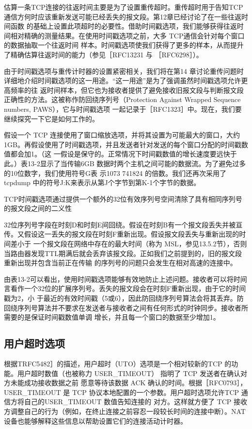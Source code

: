 估算一条TCP连接的往返时间主要是为了设置重传超时。重传超时用于告知TCP通信方何时应该重新发送可能已经丢失的报文段。第12章已经讨论了在一些往返时间函数
的基础上设置此项超时的必要性。借助时间戳选项，我们能够获得往返时间相对精确的测量结果。在使用时间戳选项之前，大多 TCP通信会针对每个窗口的数据抽取一个往返时间
样本。时间戳选项使我们获得了更多的样本，从而提升了精确估算往返时间的能力（参见［RFC13231 与 ［RFC6298］）。

由于时间戳选项与重传计时器的设置紧密相关，我们将在第14 章讨论重传问题时详细地介绍时间戳选项的这一用途。“这一用途”是为了强调虽然时间戳选项允许更高频率的往
返时间样本，但它也为接收者提供了避免接收旧报文段与判断报文段正确性的方法。这被称作防回绕序列号（Protection Against Wrapped Sequence numbers, PAWS），它与时间戳选项
一起记录于［RFC1323］中。现在，我们要继续探究一下它是如何工作的。

假设一个 TCP 连接使用了窗口缩放选项，并将其设置为可能最大的窗口，大约1GB。再假设使用了时间戳选项，并且发送者针对发送的每个窗口分配的时间戳数值都会加1。（这
一假设是保守的。正常情况下时间戳数值的增长速度要远快于此。）表13-2显示了当传输6GB 数据时两个主机之间可能的数据流。为了避免过多的10位数字，我们使用符号G表
示1073 741824 的倍数。我们还再次采用了 tcpdump 中的符号J:K来表示从第J个字节到第K-1个字节的数据。

TCP时间戳选项通过提供一个额外的32位有效序列号空间清除了具有相同序列号的报文段之间的二义性

32位序列号字段在时刻D和时刻E间回绕。假设在时刻B有一个报文段丢失并被亘传。又假设这一丢失的报文段在时刻F重新出现。假设报文段丢失与重新出现的时间差小于
一个报文段在网络中存在的最大时间（称为 MSL，参见13.5.2节），否则当路由器发现TTL期满后就会丢弃该报文段。正如我们之前提到的，旧的报文段重新出现并包含当前正在传输
的序列号的问题只会发生在相对高速的连接中。

由表13-2可以看出，使用时间戳选项能够有效地防止上述问题。接收者可以将时间言看作一个32位的扩展序列号。丢失的报文段会在时刻F重新出现，由于它的时间戳为2，小
于最近的有效时间戳（5或6），因此防回绕序列号算法会将其丢弃。防回绕序列号算法并不要求在发送者与接收者之间有任何形式的时钟同步。接收者所需要的是保证时间戳数值单调
增长，并且每一个窗口的数据至少增加1。

\subsection{用户超时选项}
根据TRFC5482］的描述，用户超时（UTO）选项是一个相对较新的TCP 的功能。用户超时数值（也被称力 USER\_TIMEOUT） 指明了 TCP 发送者在确认对方未能成功接收数据之前
愿意等待该数据 ACK 确认的时间。根据［RFC0793］，USER\_TIMEOUT 是 TCP 协议本地配置的一个参数。用户超时选项允许TCP 通信方将自己的USER\_TIMEOUT 数值告知连接的
对方。这样就方便了 TCP 接收方调整自己的行为（例如，在终止连接之前容忍一段较长时间的连接中断）。NAT设备也能够解释这些信息以帮助设置它们的连接活动计时器。


